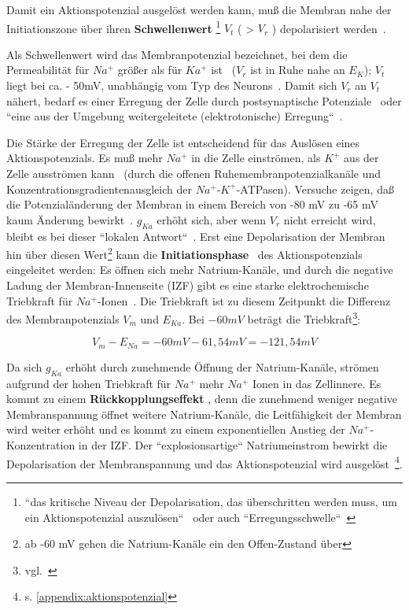 {{Damit ein Aktionspotenzial ausgelöst werden kann, muß die Membran nahe der Initiationszone über ihren \textbf{Schwellenwert} \footnote{
 ``das kritische Niveau der Depolarisation, das überschritten werden muss, um ein Aktionspotenzial auszulösen``~\cite[88]{BCP18} oder auch ``Erregungsschwelle``~\cite[69]{FE19}
} $V_t$ ( > $V_r$ ) depolarisiert werden~\cite[111]{BCP18}.


 Als Schwellenwert wird das Membranpotenzial bezeichnet, bei dem die Permeabilität für $Na^+$ größer als für $Ka^+$ ist~\cite[103]{BCP18} ($V_r$ ist in Ruhe nahe an $E_K$); $V_t$ liegt bei ca. - 50mV, unabhängig vom Typ des Neurons~\cite[75]{Jon19}.
 Damit sich $V_r$ an $V_t$ nähert, bedarf es einer Erregung der Zelle durch postsynaptische Potenziale~\cite[69]{FE19} oder ``eine aus der Umgebung weitergeleitete (elektrotonische) Erregung``~\cite[46]{SD07}.

Die Stärke der Erregung der Zelle ist entscheidend für das Auslösen eines Aktionspotenzials. Es muß mehr $Na^+$ in die Zelle einströmen, als $K^+$ aus der Zelle ausströmen kann~\cite[69]{FE19} (durch die offenen Ruhemembranpotenzialkanäle und Konzentrationsgradientenausgleich der $Na^+$-$K^+$-ATPasen).
Versuche zeigen, daß die Potenzialänderung der Membran in einem Bereich von -80 mV zu -65 mV kaum Änderung bewirkt~\cite[99]{BCP18}. $g_{Ka}$ erhöht sich, aber wenn $V_r$ nicht erreicht wird, bleibt es bei dieser ``lokalen Antwort``~\cite[46]{SD07}. Erst eine Depolarisation der Membran hin über diesen Wert\footnote{
 ab -60 mV gehen die Natrium-Kanäle ein den Offen-Zustand über\cite[69]{FE19}
} kann die \textbf{Initiationsphase}~\cite[68]{FE19} des Aktionspotenzials eingeleitet werden: Es öffnen sich mehr Natrium-Kanäle, und durch die negative Ladung der Membran-Innenseite (IZF) gibt es eine starke elektrochemische Triebkraft für $Na^+$-Ionen~\cite[103]{BCP18}. Die Triebkraft ist zu diesem Zeitpunkt die Differenz des Membranpotenzials $V_m$ und $E_{Ka}$. Bei $-60 mV$ beträgt die Triebkraft\footnote{
 vgl.~\cite[39]{Fak19}
}:

 \begin{equation}
  V_m - E_{Na} = -60 mV - 61,54 mV = -121,54 mV
  \label{eq:gl-triebkraft}
 \end{equation}


Da sich $g_{Ka}$ erhöht durch zunehmende Öffnung der Natrium-Kanäle, strömen aufgrund der hohen Triebkraft für $Na^+$ mehr $Na^+$ Ionen in das Zellinnere. Es kommt zu einem \textbf{Rückkopplungseffekt} , denn die zunehmend weniger negative Membranspannung öffnet weitere Natrium-Kanäle, die Leitfähigkeit der Membran wird weiter erhöht und es kommt zu einem exponentiellen Anstieg der $Na^+$-Konzentration in der IZF. Der ``explosionsartige`` Natriumeinstrom bewirkt die Depolarisation der Membranspannung und das Aktionspotenzial wird ausgelöst~\cite[69]{FE19}\footnote{
s. \ref{appendix:aktionspotenzial}
}.

}}

